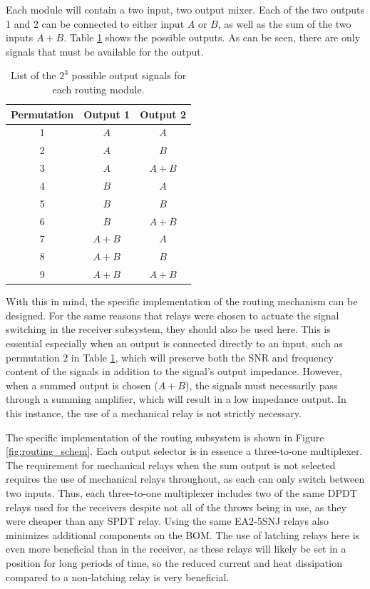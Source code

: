 \documentclass{article}
\begin{document}
	Each module will contain a two input, two output mixer.  Each of the two outputs 1 and 2 can be connected to either input $A$ or $B$, as well as the sum of the two inputs $A + B$.  Table \ref{tab:routing_outputs} shows the possible outputs.  As can be seen, there are only signals that must be available for the output.

	\begin{table}
	\begin{center}
	\begin{tabular}{ |c|c c| }
	\hline
	 Permutation & Output 1 & Output 2 \\ 
	 \hline
	 1 	& $A$ 	& $A$ \\  
	 2 	& $A$ 	& $B$ \\
	 3	& $A$ 	& $A+B$ \\
	 4	& $B$ 	& $A$ \\
	 5	& $B$ 	& $B$ \\
	 6	& $B$ 	& $A+B$ \\
	 7	& $A+B$ & $A$ \\
	 8	& $A+B$ & $B$ \\
	 9	& $A+B$ & $A+B$ \\
	 \hline
	\end{tabular}
	\caption{List of the $2^3$ possible output signals for each routing module.}
	\label{tab:routing_outputs}
	\end{center}
	\end{table}

	With this in mind, the specific implementation of the routing mechanism can be designed.  For the same reasons that relays were chosen to actuate the signal switching in the receiver subsystem, they should also be used here.  This is essential especially when an output is connected directly to an input, such as permutation 2 in Table \ref{tab:routing_outputs}, which will preserve both the SNR and frequency content of the signals in addition to the signal's output impedance.  However, when a summed output is chosen ($A+B$), the signals must necessarily pass through a summing amplifier, which will result in a low impedance output.  In this instance, the use of a mechanical relay is not strictly necessary.

	The specific implementation of the routing subsystem is shown in Figure \ref{fig:routing_schem}.  Each output selector is in essence a three-to-one multiplexer.  The requirement for mechanical relays when the sum output is not selected requires the use of mechanical relays throughout, as each can only switch between two inputs.  Thus, each three-to-one multiplexer includes two of the same DPDT relays used for the receivers despite not all of the throws being in use, as they were cheaper than any SPDT relay.  Using the same EA2-5SNJ relays also minimizes additional components on the BOM.  The use of latching relays here is even more beneficial than in the receiver, as these relays will likely be set in a position for long periods of time, so the reduced current and heat dissipation compared to a non-latching relay is very beneficial.
\end{document}
